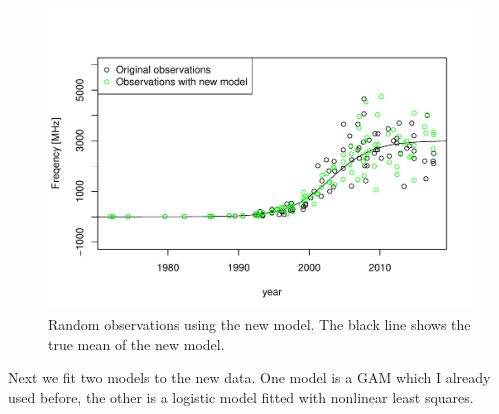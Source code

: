\documentclass{article}\usepackage[]{graphicx}\usepackage[]{color}
\newenvironment{knitrout}{}{} %
\begin{document}
\begin{figure}
\begin{knitrout}
\includegraphics[width=1\linewidth]{figure/plot6-1} \hfill{}



\end{knitrout}
\caption{Random observations using the new model. The black line shows the true mean of the new model.}
\label{fig:plot6}
\end{figure}



Next we fit two models to the new data. One model is a GAM which I already used before, the other is a logistic model fitted with nonlinear least squares.
\end{document}
